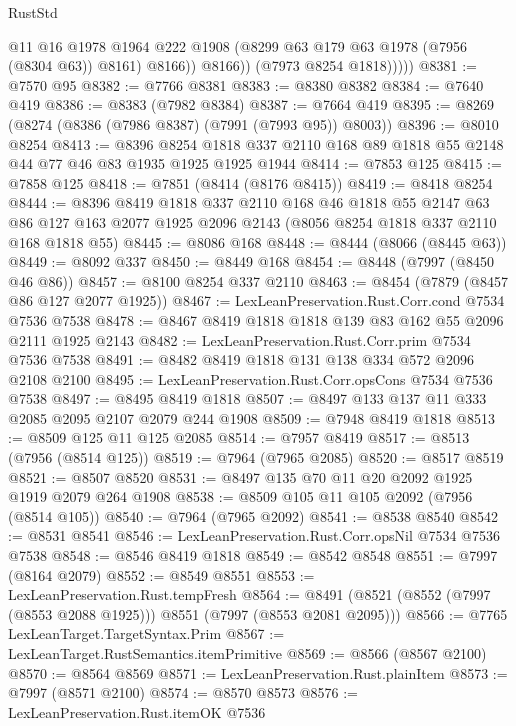 \begin{lexlean}{RustStd}
\begin{coremodule}
                    @11
                    @16
                    @1978
                    @1964
                    @222
                    @1908
                    (@8299 @63 @179 @63 @1978 (@7956 (@8304 @63)) @8161)
                    @8166))
                @8166))
            (@7973 @8254 @1818)))))
@8381 := @7570 @95
@8382 := @7766 @8381
@8383 := @8380 @8382
@8384 := @7640 @419
@8386 := @8383 (@7982 @8384)
@8387 := @7664 @419
@8395 := @8269 (@8274 (@8386 (@7986 @8387) (@7991 (@7993 @95)) @8003))
@8396 := @8010 @8254
@8413 := @8396
    @8254
    @1818
    @337
    @2110
    @168
    @89
    @1818
    @55
    @2148
    @44
    @77
    @46
    @83
    @1935
    @1925
    @1925
    @1944
@8414 := @7853 @125
@8415 := @7858 @125
@8418 := @7851 (@8414 (@8176 @8415))
@8419 := @8418 @8254
@8444 := @8396
    @8419
    @1818
    @337
    @2110
    @168
    @46
    @1818
    @55
    @2147
    @63
    @86
    @127
    @163
    @2077
    @1925
    @2096
    @2143
    (@8056 @8254 @1818 @337 @2110 @168 @1818 @55)
@8445 := @8086 @168
@8448 := @8444 (@8066 (@8445 @63))
@8449 := @8092 @337
@8450 := @8449 @168
@8454 := @8448 (@7997 (@8450 @46 @86))
@8457 := @8100 @8254 @337 @2110
@8463 := @8454 (@7879 (@8457 @86 @127 @2077 @1925))
@8467 := LexLeanPreservation.Rust.Corr.cond @7534 @7536 @7538
@8478 := @8467 @8419 @1818 @1818 @139 @83 @162 @55 @2096 @2111 @1925 @2143
@8482 := LexLeanPreservation.Rust.Corr.prim @7534 @7536 @7538
@8491 := @8482 @8419 @1818 @131 @138 @334 @572 @2096 @2108 @2100
@8495 := LexLeanPreservation.Rust.Corr.opsCons @7534 @7536 @7538
@8497 := @8495 @8419 @1818
@8507 := @8497 @133 @137 @11 @333 @2085 @2095 @2107 @2079 @244 @1908
@8509 := @7948 @8419 @1818
@8513 := @8509 @125 @11 @125 @2085
@8514 := @7957 @8419
@8517 := @8513 (@7956 (@8514 @125))
@8519 := @7964 (@7965 @2085)
@8520 := @8517 @8519
@8521 := @8507 @8520
@8531 := @8497 @135 @70 @11 @20 @2092 @1925 @1919 @2079 @264 @1908
@8538 := @8509 @105 @11 @105 @2092 (@7956 (@8514 @105))
@8540 := @7964 (@7965 @2092)
@8541 := @8538 @8540
@8542 := @8531 @8541
@8546 := LexLeanPreservation.Rust.Corr.opsNil @7534 @7536 @7538
@8548 := @8546 @8419 @1818
@8549 := @8542 @8548
@8551 := @7997 (@8164 @2079)
@8552 := @8549 @8551
@8553 := LexLeanPreservation.Rust.tempFresh
@8564 := @8491 (@8521 (@8552 (@7997 (@8553 @2088 @1925))) @8551 (@7997 (@8553 @2081 @2095)))
@8566 := @7765 LexLeanTarget.TargetSyntax.Prim
@8567 := LexLeanTarget.RustSemantics.itemPrimitive
@8569 := @8566 (@8567 @2100)
@8570 := @8564 @8569
@8571 := LexLeanPreservation.Rust.plainItem
@8573 := @7997 (@8571 @2100)
@8574 := @8570 @8573
@8576 := LexLeanPreservation.Rust.itemOK @7536

\end{coremodule}
\end{lexlean}

